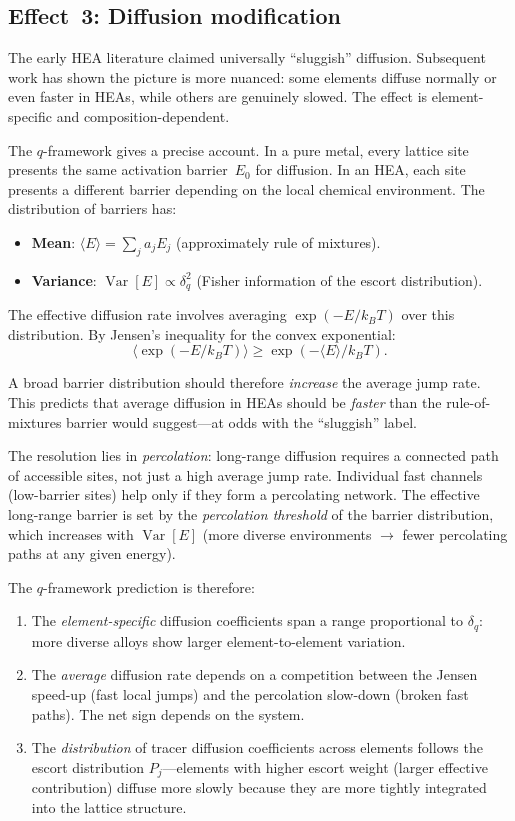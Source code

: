 \documentclass[12pt,letterpaper]{article}
\theoremstyle{definition}
\DeclareMathOperator{\Var}{Var}
\begin{document}
\subsection{Effect~3: Diffusion modification}

The early HEA literature claimed universally ``sluggish'' diffusion.  Subsequent work has shown the picture is more nuanced: some elements diffuse normally or even faster in HEAs, while others are genuinely slowed.  The effect is element-specific and composition-dependent.

The $q$-framework gives a precise account.  In a pure metal, every lattice site presents the same activation barrier~$E_0$ for diffusion.  In an HEA, each site presents a different barrier depending on the local chemical environment.  The distribution of barriers has:
\begin{itemize}
  \item \textbf{Mean}: $\langle E \rangle = \sum_j a_j E_j$ (approximately rule of mixtures).
  \item \textbf{Variance}: $\Var[E] \propto \delta_q^2$ (Fisher information of the escort distribution).
\end{itemize}

The effective diffusion rate involves averaging $\exp(-E/k_BT)$ over this distribution.  By Jensen's inequality for the convex exponential:
\begin{equation}
  \langle \exp(-E/k_BT) \rangle \geq \exp(-\langle E \rangle / k_BT).
\end{equation}

A broad barrier distribution should therefore \emph{increase} the average jump rate.  This predicts that average diffusion in HEAs should be \emph{faster} than the rule-of-mixtures barrier would suggest---at odds with the ``sluggish'' label.

The resolution lies in \emph{percolation}: long-range diffusion requires a connected path of accessible sites, not just a high average jump rate.  Individual fast channels (low-barrier sites) help only if they form a percolating network.  The effective long-range barrier is set by the \emph{percolation threshold} of the barrier distribution, which increases with $\Var[E]$ (more diverse environments $\to$ fewer percolating paths at any given energy).

The $q$-framework prediction is therefore:
\begin{enumerate}
  \item The \emph{element-specific} diffusion coefficients span a range proportional to $\delta_q$: more diverse alloys show larger element-to-element variation.
  \item The \emph{average} diffusion rate depends on a competition between the Jensen speed-up (fast local jumps) and the percolation slow-down (broken fast paths).  The net sign depends on the system.
  \item The \emph{distribution} of tracer diffusion coefficients across elements follows the escort distribution $P_j$---elements with higher escort weight (larger effective contribution) diffuse more slowly because they are more tightly integrated into the lattice structure.
\end{enumerate}
\end{document}

